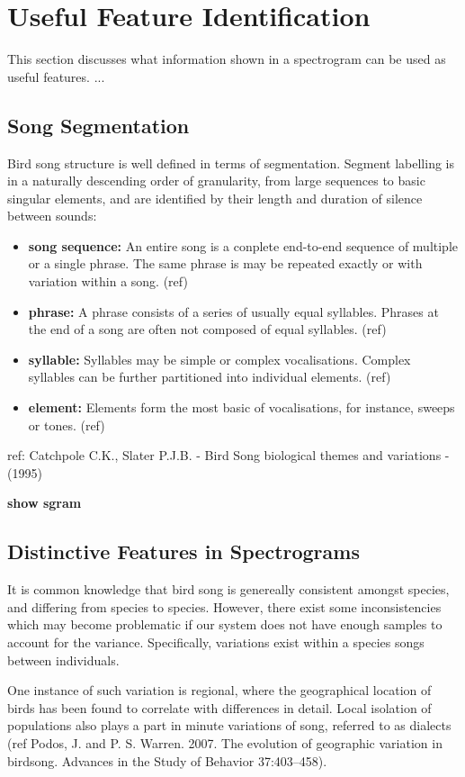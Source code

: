 \section{Useful Feature Identification}
This section discusses what information shown in a spectrogram can be used as
useful features. ...

\subsection{Song Segmentation}
Bird song structure is well defined in terms of segmentation.
Segment labelling is in a naturally descending order of granularity, from
large sequences to basic singular elements, and are identified by their length
and duration of silence between sounds:
\begin{itemize}
  \item \textbf{song sequence:}
    An entire song is a conplete end-to-end sequence of multiple or a single
    phrase.
    The same phrase is may be repeated exactly or with variation within a
    song. (ref)
  \item \textbf{phrase:}
    A phrase consists of a series of usually equal syllables.
    Phrases at the end of a song are often not composed of equal syllables. (ref)
  \item \textbf{syllable:}
    Syllables may be simple or complex vocalisations.
    Complex syllables can be further partitioned into individual elements. (ref)
  \item \textbf{element:}
    Elements form the most basic of vocalisations, for instance, sweeps or tones. (ref)
\end{itemize}

ref: Catchpole C.K., Slater P.J.B. - Bird Song biological themes and variations - (1995)

\textbf{show sgram}

\subsection{Distinctive Features in Spectrograms}
It is common knowledge that bird song is genereally consistent amongst species,
and differing from species to species.
However, there exist some inconsistencies which may become problematic if our
system does not have enough samples to account for the variance.
Specifically, variations exist within a species songs between individuals.

One instance of such variation is regional, where the geographical
location of birds has been found to correlate with differences in detail.
Local isolation of populations also plays a part in minute variations of song,
referred to as dialects
(ref Podos, J. and P. S. Warren. 2007. The evolution of geographic variation in birdsong. Advances in the Study of Behavior 37:403–458).

